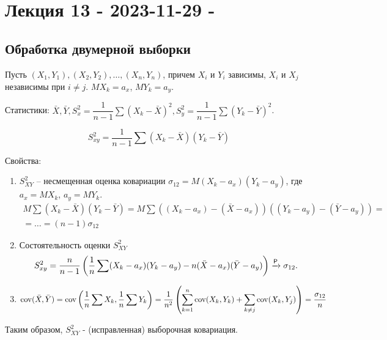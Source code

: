 \section{Лекция 13 - 2023-11-29 - }

\subsection{Обработка двумерной выборки}

Пусть $(X_1, Y_1), (X_2, Y_2), \dots, (X_n, Y_n)$, причем $X_i$ и $Y_i$ зависимы, $X_i$ и $X_j$ независимы при $i \neq j$.
$M X_k = a_x$, $M Y_k = a_y$.

Статистики: $\bar X, \bar Y, S_x^2 = \dfrac{1}{n-1} \sum (X_k - \bar X)^2, S_y^2 = \dfrac{1}{n-1} \sum (Y_k - \bar Y)^2$. 

\[
  S_{xy}^2 = \dfrac{1}{n-1} \sum (X_k - \bar X) (Y_k - \bar Y)
\]

Свойства:
\begin{enumerate}
  \item $S_{XY}^2$ -- несмещенная оценка ковариации $\sigma_{12} = M(X_k - a_x)(Y_k - a_y)$,
    где $a_x = MX_k$, $a_y = MY_k$.
    \begin{multline*}
      M \sum (X_k - \bar X)(Y_k - \bar Y)
      = M \sum \left( (X_k - a_x) - (\bar X - a_x)\right)
        \left( (Y_k-a_y) - (\bar Y - a_y) \right) = \\
      = \dots
      = (n-1) \sigma_{12}
    \end{multline*}

  \item Состоятельность оценки $S_{XY}^2$
    \begin{equation*}
      S_{xy}^2 = \dfrac{n}{n-1} \left( \dfrac{1}{n} \sum (X_k - a_x)(Y_k - a_y) - n (\bar X - a_x)(\bar Y - a_y) \right)
      \xrightarrow[]{\mathsf P}
      \sigma_{12}.
    \end{equation*}
    
  \item
    \begin{equation*}
      \operatorname{cov} (\bar X, \bar Y) = \operatorname{cov} \left( \dfrac{1}{n} \sum X_k, \dfrac{1}{n} \sum Y_k \right)
      = \dfrac{1}{n^2} \left( \sum_{k=1}^n \operatorname{cov} (X_k, Y_k) + \sum_{k\neq j} \operatorname{cov}(X_k, Y_j) \right)
      = \dfrac{\sigma_{12}}{n}
    \end{equation*}
\end{enumerate}

Таким образом, $S_{XY}^2$ - (исправленная) выборочная ковариация.


